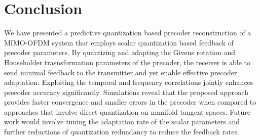 \documentclass[journal,10pt,twocolumn]{IEEEtran}
\begin{document}



\section{Conclusion}
\label{section4}
We have presented a predictive quantization based precoder
reconstruction of a MIMO-OFDM system that employs scalar quantization
based feedback of precoder parameters. By quantizing and adapting the
Givens rotation and Householder trasnsformation parameters of the
precoder, the receiver is able to send minimal feedback to the
transmitter and yet enable effective precoder adaptation. Exploiting
the temporal and frequency correlations jointly enhances precoder
accuracy significantly. Simulations reveal that the proposed approach
provides faster convergence and smaller errors in the precoder when
compared to approaches that involve direct quantization on manifold
tangent spaces. Future work would involve tuning the adaptation rate
of the scalar parameters and further reductions of quantization
redundancy to reduce the feedback rates.














\renewcommand{\bibfont}{\footnotesize}




\end{document}
